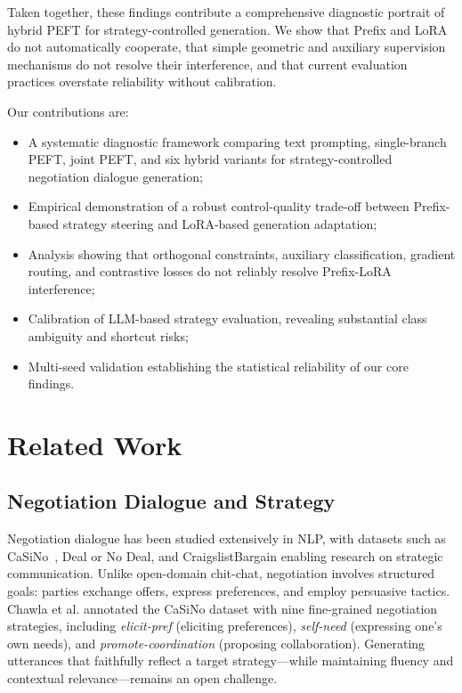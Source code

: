\documentclass[conference]{IEEEtran}
\begin{document}
Taken together, these findings contribute a comprehensive diagnostic portrait of hybrid PEFT for strategy-controlled generation. We show that Prefix and LoRA do not automatically cooperate, that simple geometric and auxiliary supervision mechanisms do not resolve their interference, and that current evaluation practices overstate reliability without calibration.

Our contributions are:
\begin{itemize}
\item A systematic diagnostic framework comparing text prompting, single-branch PEFT, joint PEFT, and six hybrid variants for strategy-controlled negotiation dialogue generation;
\item Empirical demonstration of a robust control-quality trade-off between Prefix-based strategy steering and LoRA-based generation adaptation;
\item Analysis showing that orthogonal constraints, auxiliary classification, gradient routing, and contrastive losses do not reliably resolve Prefix-LoRA interference;
\item Calibration of LLM-based strategy evaluation, revealing substantial class ambiguity and shortcut risks;
\item Multi-seed validation establishing the statistical reliability of our core findings.
\end{itemize}

\section{Related Work}

\subsection{Negotiation Dialogue and Strategy}

Negotiation dialogue has been studied extensively in NLP, with datasets such as CaSiNo~\cite{chawla2021casino}, Deal or No Deal, and CraigslistBargain enabling research on strategic communication. Unlike open-domain chit-chat, negotiation involves structured goals: parties exchange offers, express preferences, and employ persuasive tactics. Chawla et al. annotated the CaSiNo dataset with nine fine-grained negotiation strategies, including \textit{elicit-pref} (eliciting preferences), \textit{self-need} (expressing one's own needs), and \textit{promote-coordination} (proposing collaboration). Generating utterances that faithfully reflect a target strategy---while maintaining fluency and contextual relevance---remains an open challenge.
\end{document}
